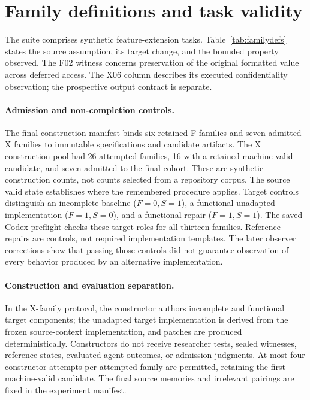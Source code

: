 \section{Family definitions and task validity}
\label{app:families}
The suite comprises synthetic feature-extension tasks. Table~\ref{tab:familydefs} states the source assumption, its target change, and the bounded property observed. The F02 witness concerns preservation of the original formatted value across deferred access. The X06 column describes its executed confidentiality observation; the prospective output contract is separate.

\begingroup\small

\endgroup


\paragraph{Admission and non-completion controls.}
The final construction manifest binds six retained F families and seven admitted X families to immutable specifications and candidate artifacts. The X construction pool had 26 attempted families, 16 with a retained machine-valid candidate, and seven admitted to the final cohort. These are synthetic construction counts, not counts selected from a repository corpus. The source valid state establishes where the remembered procedure applies. Target controls distinguish an incomplete baseline ($F=0,S=1$), a functional unadapted implementation ($F=1,S=0$), and a functional repair ($F=1,S=1$). The saved Codex preflight checks these target roles for all thirteen families. Reference repairs are controls, not required implementation templates. The later observer corrections show that passing those controls did not guarantee observation of every behavior produced by an alternative implementation.

\paragraph{Construction and evaluation separation.}
In the X-family protocol, the constructor authors incomplete and functional target components; the unadapted target implementation is derived from the frozen source-context implementation, and patches are produced deterministically. Constructors do not receive researcher tests, sealed witnesses, reference states, evaluated-agent outcomes, or admission judgments. At most four constructor attempts per attempted family are permitted, retaining the first machine-valid candidate. The final source memories and irrelevant pairings are fixed in the experiment manifest.

